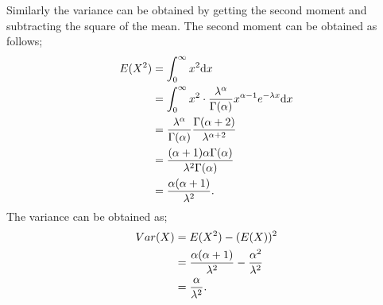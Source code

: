 Similarly the variance can be obtained by getting the second moment and subtracting the square of the mean. The second moment can be obtained as follows;
\begin{equation}
	\centering
	\begin{aligned}[b]
		E(X^2)	&=	\int_0^{\infty} x^2 {\rm d}x \\
		&=	\int_0^{\infty} x^2 \cdot \frac{\lambda^{\alpha}}{\Gamma(\alpha)} x^{\alpha - 1} e^{-\lambda x} {\rm d}x \\
		&=	\frac{\lambda^{\alpha}}{\Gamma(\alpha)} \frac{\Gamma(\alpha + 2)}{\lambda^{\alpha + 2}} \\
		&=	\frac{(\alpha + 1) \alpha \Gamma(\alpha)}{\lambda^2 \Gamma(\alpha)}\\
		&= \frac{\alpha (\alpha + 1)}{\lambda^2}.
	\end{aligned}
\end{equation}
The variance can be obtained as;
\begin{equation}
	\centering
	\begin{aligned}[b]
		Var(X) &= E(X^2) - (E(X))^2 \\
		&=	\frac{\alpha (\alpha + 1)}{\lambda^2} - \frac{\alpha^2}{\lambda^2}	\\
		&=	\frac{\alpha}{\lambda^2}.
	\end{aligned}
\end{equation}

